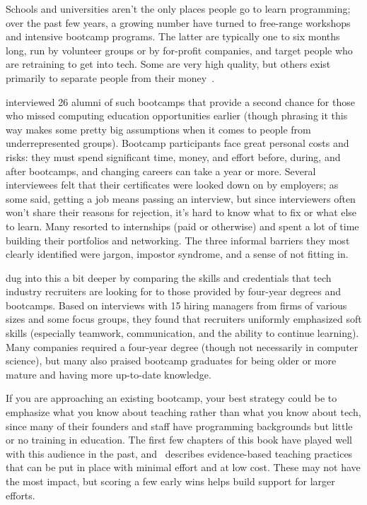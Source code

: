 
Schools and universities aren't the only places people go to learn programming;
over the past few years, a growing number have turned to free-range workshops
and intensive bootcamp programs.
The latter are typically one to six months long,
run by volunteer groups or by for-profit companies,
and target people who are retraining to get into tech.
Some are very high quality,
but others exist primarily to separate people from their money~\cite{McMi2017}.

\cite{Thay2017} interviewed 26 alumni of such bootcamps
that provide a second chance for those who missed computing education opportunities earlier
(though phrasing it this way makes some pretty big assumptions
when it comes to people from underrepresented groups).
Bootcamp participants face great personal costs and risks:
they must spend significant time, money, and effort before, during, and after bootcamps,
and changing careers can take a year or more.
Several interviewees felt that their certificates were looked down on by employers;
as some said,
getting a job means passing an interview,
but since interviewers often won't share their reasons for rejection,
it's hard to know what to fix or what else to learn.
Many resorted to internships (paid or otherwise)
and spent a lot of time building their portfolios and networking.
The three informal barriers they most clearly identified were jargon,
impostor syndrome,
and a sense of not fitting in.

\cite{Burk2018} dug into this a bit deeper
by comparing the skills and credentials that tech industry recruiters are looking for
to those provided by four-year degrees and bootcamps.
Based on interviews with 15 hiring managers from firms of various sizes and some focus groups,
they found that recruiters uniformly emphasized soft skills
(especially teamwork, communication, and the ability to continue learning).
Many companies required a four-year degree
(though not necessarily in computer science),
but many also praised bootcamp graduates for being older or more mature
and having more up-to-date knowledge.

If you are approaching an existing bootcamp,
your best strategy could be to emphasize what you know about teaching
rather than what you know about tech,
since many of their founders and staff have programming backgrounds
but little or no training in education.
The first few chapters of this book have played well with this audience in the past,
and~\cite{Lang2016} describes
evidence-based teaching practices that can be put in place
with minimal effort and at low cost.
These may not have the most impact,
but scoring a few early wins helps build support for larger efforts.

